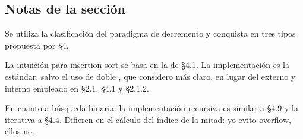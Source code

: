\subsection*{Notas de la sección}

Se utiliza la clasificación del paradigma de decremento y conquista en tres tipos propuesta por \textcite{levitin} \S 4.

La intuición para insertion sort se basa en la de \textcite{levitin} \S 4.1. La implementación es la estándar, salvo el uso de doble , que considero más claro, en lugar del  externo y  interno empleado en \textcite{cormen} \S 2.1, \textcite{levitin} \S 4.1 y \textcite{cardoso} \S 2.1.2.

En cuanto a búsqueda binaria: la implementación recursiva es similar a \textcite{skiena} \S 4.9 y la iterativa a \textcite{levitin} \S 4.4. Difieren en el cálculo del índice de la mitad: yo evito overflow, ellos no.

